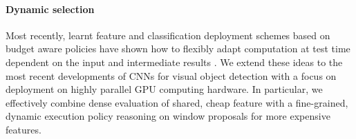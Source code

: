 \paragraph{Dynamic selection}\label{dynamic-selection}
Most recently, learnt feature and classification deployment schemes based on budget aware policies have shown how to flexibly adapt computation at test time dependent on the input and intermediate results \cite{Karayev-NIPS-2012,karayev14cvpr}. We extend these ideas to the most recent developments of CNNs for visual object detection with a focus on deployment on highly parallel GPU computing hardware. In particular, we effectively combine  dense evaluation of shared, cheap feature with a fine-grained, dynamic execution policy reasoning on window proposals for more expensive features.

